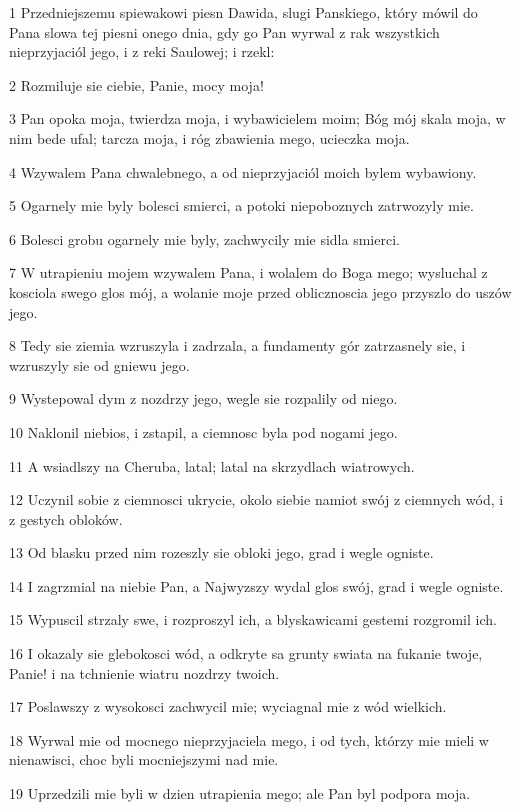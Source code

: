 \par 1 Przedniejszemu spiewakowi piesn Dawida, slugi Panskiego, który mówil do Pana slowa tej piesni onego dnia, gdy go Pan wyrwal z rak wszystkich nieprzyjaciól jego, i z reki Saulowej; i rzekl:
\par 2 Rozmiluje sie ciebie, Panie, mocy moja!
\par 3 Pan opoka moja, twierdza moja, i wybawicielem moim; Bóg mój skala moja, w nim bede ufal; tarcza moja, i róg zbawienia mego, ucieczka moja.
\par 4 Wzywalem Pana chwalebnego, a od nieprzyjaciól moich bylem wybawiony.
\par 5 Ogarnely mie byly bolesci smierci, a potoki niepoboznych zatrwozyly mie.
\par 6 Bolesci grobu ogarnely mie byly, zachwycily mie sidla smierci.
\par 7 W utrapieniu mojem wzywalem Pana, i wolalem do Boga mego; wysluchal z kosciola swego glos mój, a wolanie moje przed oblicznoscia jego przyszlo do uszów jego.
\par 8 Tedy sie ziemia wzruszyla i zadrzala, a fundamenty gór zatrzasnely sie, i wzruszyly sie od gniewu jego.
\par 9 Wystepowal dym z nozdrzy jego, wegle sie rozpalily od niego.
\par 10 Naklonil niebios, i zstapil, a ciemnosc byla pod nogami jego.
\par 11 A wsiadlszy na Cheruba, latal; latal na skrzydlach wiatrowych.
\par 12 Uczynil sobie z ciemnosci ukrycie, okolo siebie namiot swój z ciemnych wód, i z gestych obloków.
\par 13 Od blasku przed nim rozeszly sie obloki jego, grad i wegle ogniste.
\par 14 I zagrzmial na niebie Pan, a Najwyzszy wydal glos swój, grad i wegle ogniste.
\par 15 Wypuscil strzaly swe, i rozproszyl ich, a blyskawicami gestemi rozgromil ich.
\par 16 I okazaly sie glebokosci wód, a odkryte sa grunty swiata na fukanie twoje, Panie! i na tchnienie wiatru nozdrzy twoich.
\par 17 Poslawszy z wysokosci zachwycil mie; wyciagnal mie z wód wielkich.
\par 18 Wyrwal mie od mocnego nieprzyjaciela mego, i od tych, którzy mie mieli w nienawisci, choc byli mocniejszymi nad mie.
\par 19 Uprzedzili mie byli w dzien utrapienia mego; ale Pan byl podpora moja.

